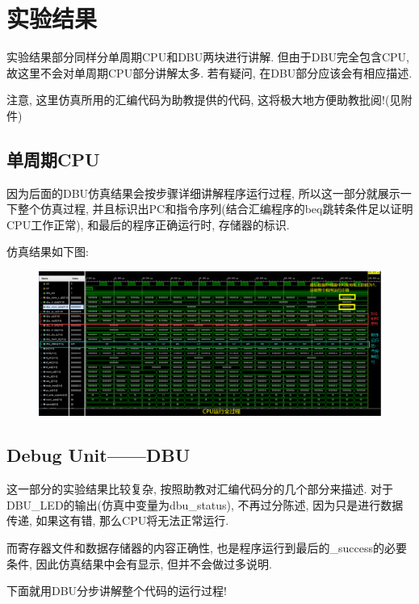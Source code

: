 \documentclass[UTF8]{article}
\begin{document}
\section{实验结果}
实验结果部分同样分单周期CPU和DBU两块进行讲解. 但由于DBU完全包含CPU, 故这里不会对单周期CPU部分讲解太多. 若有疑问, 在DBU部分应该会有相应描述.\par
注意, 这里仿真所用的汇编代码为助教提供的代码, 这将极大地方便助教批阅!(见附件)\par
\subsection{单周期CPU}
因为后面的DBU仿真结果会按步骤详细讲解程序运行过程, 所以这一部分就展示一下整个仿真过程, 并且标识出PC和指令序列(结合汇编程序的beq跳转条件足以证明CPU工作正常), 和最后的程序正确运行时, 存储器的标识.\par
仿真结果如下图:\par
\begin{figure}[H]
	\centering
	\includegraphics[width=\linewidth]{cpu.png}
\end{figure}
\subsection{Debug Unit——DBU}
这一部分的实验结果比较复杂, 按照助教对汇编代码分的几个部分来描述.
对于DBU\_LED的输出(仿真中变量为dbu\_status), 不再过分陈述, 因为只是进行数据传递, 如果这有错, 那么CPU将无法正常运行.\par
而寄存器文件和数据存储器的内容正确性, 也是程序运行到最后的\_success的必要条件, 因此仿真结果中会有显示, 但并不会做过多说明.\par
下面就用DBU分步讲解整个代码的运行过程!\par
\end{document}
